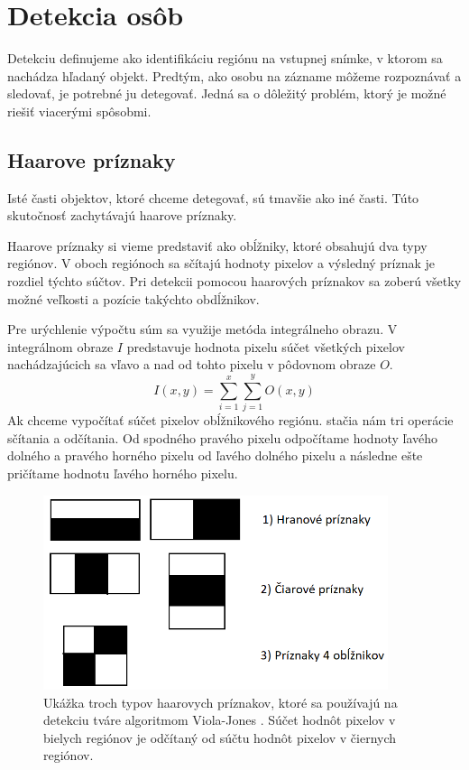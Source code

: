\chapter{Detekcia osôb}
\label{kap:detection}
Detekciu definujeme ako identifikáciu regiónu na vstupnej snímke, v ktorom sa nachádza hľadaný objekt.
Predtým, ako osobu na zázname môžeme rozpoznávať a sledovať, je potrebné ju detegovať.
Jedná sa o dôležitý problém, ktorý je možné riešiť viacerými spôsobmi.

\section{Haarove príznaky}
Isté časti objektov, ktoré chceme detegovať, sú tmavšie ako iné časti.
Túto skutočnosť zachytávajú haarove príznaky.

Haarove príznaky si vieme predstaviť ako obĺžniky, ktoré obsahujú dva typy regiónov.
V oboch regiónoch sa sčítajú hodnoty pixelov a výsledný príznak je rozdiel týchto súčtov.
Pri detekcii pomocou haarových príznakov sa zoberú všetky možné veľkosti a pozície takýchto obdĺžnikov.

Pre urýchlenie výpočtu súm sa využije metóda integrálneho obrazu.
V integrálnom obraze $I$ predstavuje hodnota pixelu súčet všetkých pixelov nachádzajúcich sa vľavo a nad od tohto pixelu v pôdovnom obraze $O$.
$$I(x, y) = \sum_{i=1}^{x} \sum_{j=1}^{y} O(x, y)$$
Ak chceme vypočítať súčet pixelov obĺžnikového regiónu. stačia nám tri operácie sčítania a odčítania.
Od spodného pravého pixelu odpočítame hodnoty ľavého dolného a pravého horného pixelu od ľavého dolného pixelu a následne ešte pričítame hodnotu ľavého horného pixelu.

\begin{figure}[H]
\centerline{\includegraphics[width=0.9\textwidth]{images/haar}}
\caption[Haarove príznaky]{Ukážka troch typov haarovych príznakov, ktoré sa používajú na detekciu tváre algoritmom Viola-Jones \cite{violajones}. Súčet hodnôt pixelov v bielych regiónov je odčítaný od súčtu hodnôt pixelov v čiernych regiónov.}
\label{obr:haar}
\end{figure}

